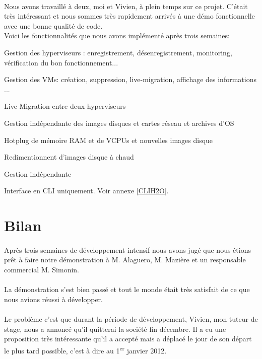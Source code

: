 \paragraph*{}
Nous avons travaillé à deux, moi et Vivien, à plein temps sur ce projet. C'était très intéressant et nous sommes très rapidement arrivés à une démo fonctionnelle avec une bonne
qualité de code.
\\
Voici les fonctionnalités que nous avons implémenté après trois semaines:
\begin{listi}
	\item Gestion des hyperviseurs : enregistrement, désenregistrement, monitoring, vérification du bon fonctionnement...
	\item Gestion des VMs: création, suppression, live-migration, affichage des informations ...
	\item Live Migration entre deux hyperviseurs
	\item Gestion indépendante des images disques et cartes réseau et archives d'OS
	\item Hotplug de mémoire RAM et de VCPUs et nouvelles images disque
	\item Redimentionnent d'images disque à chaud
	\item Gestion indépendante
	\item Interface en CLI uniquement. Voir annexe \ref{CLIH2O}.
\end{listi}

\section{Bilan}

\paragraph*{}
Après trois semaines de développement intensif nous avons jugé que nous étions prêt à faire notre démonstration à M. Alaguero, M. Mazière et un responsable commercial
M. Simonin.

\paragraph*{}
La démonstration s'est bien passé et tout le monde était très satisfait de ce que nous avions réussi à développer.

\paragraph*{}
Le problème c'est que durant la période de développement, Vivien, mon tuteur de stage, nous a annoncé qu'il quitterai la société fin décembre. Il a eu une proposition très intéressante
qu'il a accepté mais a déplacé le jour de son départ le plus tard possible, c'est à dire au 1\textsuperscript{er} janvier 2012.

